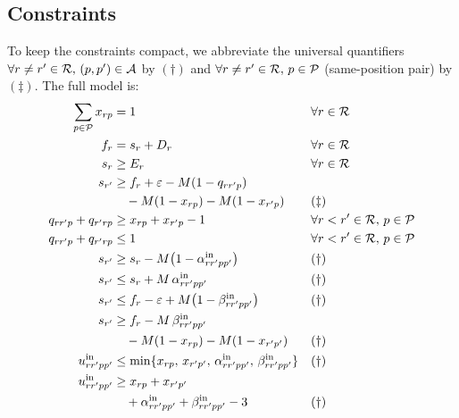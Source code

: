 \subsection*{Constraints}

To keep the constraints compact, we abbreviate the universal quantifiers
$\forall r \ne r' \in \mathcal{R},\, (p, p') \in \mathcal{A}$ by $(\dagger)$ and
$\forall r \ne r' \in \mathcal{R},\, p \in \mathcal{P}$ (same-position pair) by
$(\ddagger)$.  The full model is:
\begin{align}
  \sum_{p \in \calP} x_{rp} &= 1
    && \forall r \in \calR \label{eq:assign}\\
  f_r &= s_r + D_r
    && \forall r \in \calR \label{eq:dur}\\
  s_r &\ge E_r
    && \forall r \in \calR \label{eq:earlystart}\\
  s_{r'} &\ge f_r + \varepsilon
              - M(1 - q_{rr'p}) \notag\\
         &\quad - M(1 - x_{rp}) - M(1 - x_{r'p})
    && (\ddagger) \label{eq:sep}\\
  q_{rr'p} + q_{r'rp} &\ge x_{rp} + x_{r'p} - 1
    && \forall r < r' \in \calR,\, p \in \calP \label{eq:ordLB}\\
  q_{rr'p} + q_{r'rp} &\le 1
    && \forall r < r' \in \calR,\, p \in \calP \label{eq:ordUB}\\
  s_{r'} &\ge s_r - M\bigl(1 - \alpha^{\mathrm{in}}_{rr'pp'}\bigr)
    && (\dagger) \label{eq:alphaInLB}\\
  s_{r'} &\le s_r + M\,\alpha^{\mathrm{in}}_{rr'pp'}
    && (\dagger) \label{eq:alphaInUB}\\
  s_{r'} &\le f_r - \varepsilon
              + M\bigl(1 - \beta^{\mathrm{in}}_{rr'pp'}\bigr)
    && (\dagger) \label{eq:betaInUB}\\
  s_{r'} &\ge f_r - M\,\beta^{\mathrm{in}}_{rr'pp'} \notag\\
         &\quad - M(1 - x_{rp}) - M(1 - x_{r'p'})
    && (\dagger) \label{eq:betaInLB}\\
  u^{\mathrm{in}}_{rr'pp'} &\le \min\{x_{rp},\, x_{r'p'},\,
                                   \alpha^{\mathrm{in}}_{rr'pp'},\,
                                   \beta^{\mathrm{in}}_{rr'pp'}\}
    && (\dagger) \label{eq:uInUB}\\
  u^{\mathrm{in}}_{rr'pp'} &\ge x_{rp} + x_{r'p'} \notag\\
                           &\quad + \alpha^{\mathrm{in}}_{rr'pp'}
                           + \beta^{\mathrm{in}}_{rr'pp'} - 3
    && (\dagger) \label{eq:uInLB}\\

\end{align}
